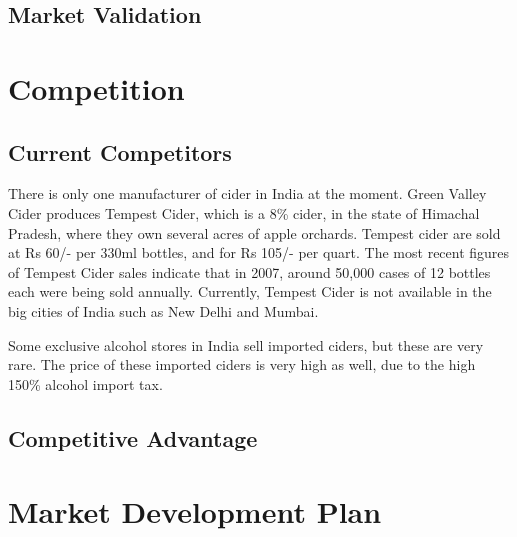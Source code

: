 \documentclass[11pt]{article}
\begin{document}
  \subsection{Market Validation}

\newpage
\section{Competition}
	\subsection{Current Competitors}
		There is only one manufacturer of cider in India at the moment. Green Valley
		Cider produces Tempest Cider, which is a 8\% cider, in the state of Himachal
		Pradesh, where they own several acres of apple orchards. Tempest cider are sold 
		at Rs 60/- per 330ml bottles, and for Rs 105/- per quart. The most recent figures
		of Tempest Cider sales indicate that in 2007, around 50,000 cases of 12 bottles
		each were being sold annually. Currently, Tempest Cider is not available in the
		big cities of India such as New Delhi and Mumbai.

		Some exclusive alcohol stores in India sell imported ciders, but these are very
		rare. The price of these imported ciders is very high as well, due to the high 
		150\% alcohol import tax.

  \subsection{Competitive Advantage}

\newpage

\section{Market Development Plan}
\end{document}
